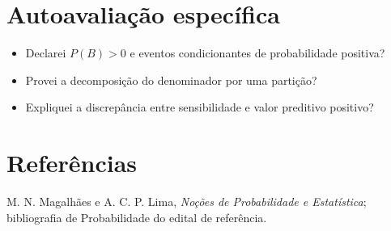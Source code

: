 \documentclass[11pt,a4paper]{article}
\begin{document}
\section{Autoavaliação específica}
\begin{itemize}
\item Declarei $P(B)>0$ e eventos condicionantes de probabilidade positiva?
\item Provei a decomposição do denominador por uma partição?
\item Expliquei a discrepância entre sensibilidade e valor preditivo positivo?
\end{itemize}
\RubricaUFMT
\section{Referências}
M. N. Magalhães e A. C. P. Lima, \emph{Noções de Probabilidade e Estatística}; bibliografia de Probabilidade do edital de referência.
\end{document}
